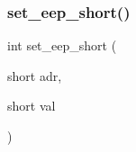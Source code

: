 \mbox{\label{eep_8h_a894a963607dc0a760684822427096867}} 
\subsubsection{set\+\_\+eep\+\_\+short()}
{\footnotesize\ttfamily int set\+\_\+eep\+\_\+short (\begin{DoxyParamCaption}\item[{short}]{adr,  }\item[{short}]{val }\end{DoxyParamCaption})}


